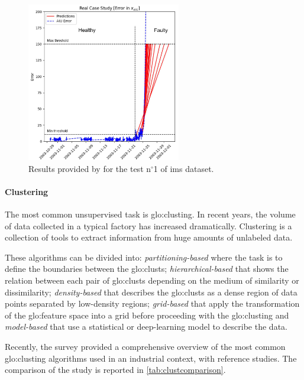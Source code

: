 \begin{figure}
    \centering
    \includegraphics[width=0.6\textwidth]{images/IMS/UmbertoResults.png}
    \caption{Results provided by \cite{Umberto} for the test $\text{n}^\circ$1 of \gls{ims} dataset.}
    \label{fig:umbertoresult}
\end{figure}


\paragraph*{Clustering}
The most common unsupervised task is \gls{glo:clust}ing. In recent years, the volume of data collected in a typical factory has increased dramatically. Clustering is a collection of tools to extract information from huge amounts of unlabeled data. 

These algorithms can be divided into: \emph{partitioning-based} where the task is to define the boundaries between the \gls{glo:clust}s; \emph{hierarchical-based} that shows the relation between each pair of \gls{glo:clust}s depending on the medium of similarity or dissimilarity; \emph{density-based} that describes the \gls{glo:clust}s as a dense region of data points separated by low-density regions; \emph{grid-based} that apply the transformation of the \gls{glo:feature} space into a grid before proceeding with the \gls{glo:clust}ing and \emph{model-based} that use a statistical or deep-learning model to describe the data.

Recently, the survey \cite{Abla2019survey} provided a comprehensive overview of the most common \gls{glo:clust}ing algorithms used in an industrial context, with reference studies. The comparison of the study is reported in \autoref{tab:clustcomparison}.

{\small}